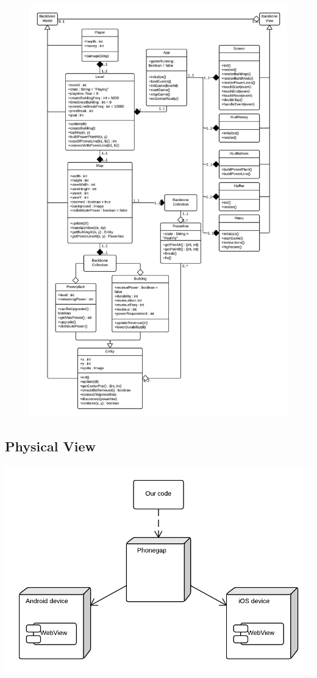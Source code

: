 	\begin{figure}[H]
	\centering
	\includegraphics[width=\textwidth, height=\textheight, keepaspectratio]{pictures/class_diagram}
	\end{figure}

\subsection{Physical View}

	\includegraphics[width=\textwidth]{pictures/deployment_diagram}

